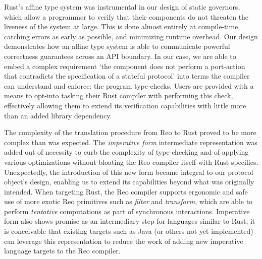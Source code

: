 Rust's affine type system was instrumental in our design of static governors, which allow a programmer to verify that their components do not threaten the liveness of the system at large. This is done almost entirely at compile-time, catching errors as early as possible, and minimizing runtime overhead. Our design demonstrates how an affine type system is able to communicate powerful correctness guarantees across an API boundary. In our case, we are able to embed a complex requirement `the component does not perform a port-action that contradicts the specification of a stateful protocol' into terms the compiler can understand and enforce: the program type-checks. Users are provided with a means to opt-into tasking their Rust compiler with performing this check, effectively allowing them to extend its verification capabilities with little more than an added library dependency. 


The complexity of the translation procedure from Reo to Rust
proved to be more complex than was expected. The \textit{imperative form} intermediate representation was added out of necessity to curb the complexity of type-checking and of applying various optimizations without bloating the Reo compiler itself with Rust-specifics. Unexpectedly, the introduction of this new form became integral to our protocol object's design, enabling us to extend its capabilities beyond what was originally intended. When targeting Rust, the Reo compiler supports ergonomic and safe use of more exotic Reo primitives such as \textit{filter} and \textit{transform}, which are able to perform \textit{tentative} computations as part of synchronous interactions. Imperative form also shows promise as an intermediary step for languages similar to Rust; it is conceivable that existing targets such as Java (or others not yet implemented) can leverage this representation to reduce the work of adding new imperative language targets to the Reo compiler. 


